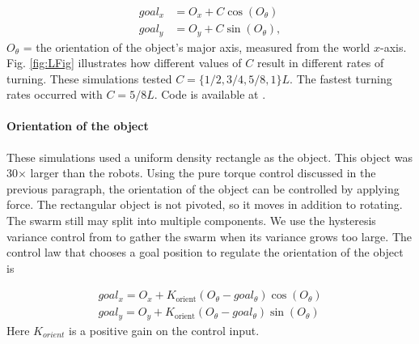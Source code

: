 \begin{align}\nonumber
goal_x &= O_x + C \cos(O_{\theta}) \\
goal_y &= O_y + C \sin(O_{\theta}),  \label{eq:TorqueControl}
\end{align}
$O_{\theta}$ = the orientation of the object's major axis, measured from the world $x$-axis.
 Fig. \ref{fig:LFig} illustrates how different values of $C$ result in different rates of turning. These simulations tested $C = \{1/2, 3/4, 5/8, 1\}L$. The fastest turning rates occurred with  $C =  5/8L$. Code is available at \cite{Shahrokhi16torque}.

%


\paragraph{Orientation of the object}
These simulations used a uniform density rectangle as the object. This object was 30$\times$ larger than the robots.
Using the pure torque control discussed in the previous paragraph, the orientation of the object can be controlled by applying force. 
The rectangular object is not pivoted, so it moves in addition to rotating. 
 The swarm still may split into multiple components.
  We use the hysteresis variance control from \cite{ShahrokhiIROS2015}  to gather the swarm when its variance grows too large. 
  The control law that chooses a goal position to regulate the orientation of the object is
  
 \begin{align}\nonumber
goal_x = O_x +  K_{\textrm{orient}}  (O_{\theta} - goal_\theta ) \cos(O_{\theta}) \\
goal_y = O_y +  K_{\textrm{orient}}   ( O_{\theta} -goal_\theta  ) \sin(O_{\theta})
\end{align}
Here $K_{orient}$ is a positive gain on the control input.  



